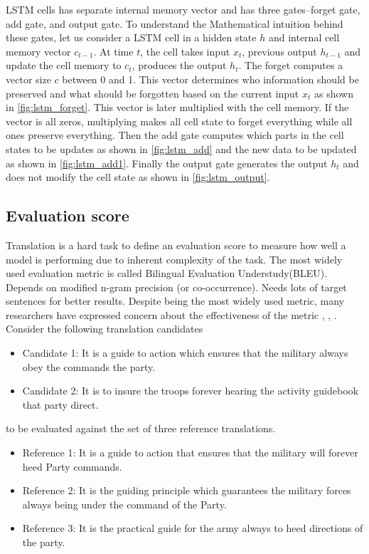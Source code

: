 \documentclass[conference]{IEEEtran}
\begin{document}
LSTM cells has separate internal memory vector and has three gates--forget gate, add gate, and output gate. To understand the Mathematical intuition behind these gates, let us consider a LSTM cell in a hidden state $h$ and internal cell memory vector $c_{t-1}$. At time $t$, the cell takes input $x_t$, previous output $h_{t-1}$ and update the cell memory to $c_{t}$, produces the output $h_{t}$. The forget computes a vector size $c$ between 0 and 1. This vector determines who information should be preserved and what should be forgotten based on the current input $x_t$ as shown in \ref{fig:lstm_forget}. This vector is later multiplied with the cell memory. If the vector is all zeros, multiplying makes all cell state to forget everything while all ones preserve everything. Then the add gate computes which parts in the cell states to be updates as shown in  \ref{fig:lstm_add} and the new data to be updated as shown in \ref{fig:lstm_add1}. Finally the output gate generates the output $h_t$ and does not modify the cell state as shown in \ref{fig:lstm_output}.


\subsection{Evaluation score}
Translation is a hard  task to define an evaluation score to measure how well a model is performing due to inherent complexity of the task. The most widely used evaluation metric is called Bilingual Evaluation Understudy(BLEU)\cite{papineni2002bleu}. Depends on modified n-gram precision (or co-occurrence). Needs lots of target sentences for better results. Despite being the most widely used metric, many researchers have expressed concern about the effectiveness of the metric \cite{zhang2004interpreting}, \cite{callison2006re}, \cite{ananthakrishnan2007some}. Consider the following translation candidates 

\begin{itemize}
\item Candidate 1: It is a guide to action which ensures that the military always obey the commands the party.
\item Candidate 2: It is to insure the troops forever hearing the activity guidebook that party direct.
\end{itemize}

to be evaluated against the set of three reference translations.
\begin{itemize}
\item Reference 1: It is a guide to action that ensures that the military will forever heed Party commands. 
\item Reference 2: It is the guiding principle which guarantees the military forces always being under the command of the Party.
\item Reference 3: It is the practical guide for the army always to heed directions of the party.
\end{itemize}
\end{document}
